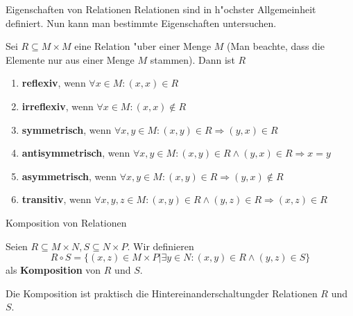 \documentclass{beamer}
\begin{document}
\begin{frame}{Eigenschaften von Relationen}
Relationen sind in h"ochster Allgemeinheit definiert. Nun kann man bestimmte Eigenschaften untersuchen.
\begin{definition}
Sei $R\subseteq M\times M$ eine Relation "uber einer Menge $M$ (Man beachte, dass die Elemente nur aus einer Menge $M$ stammen). Dann ist $R$
\begin{enumerate}
\item \textbf{reflexiv}, wenn $\forall x\in M: (x,x)\in R$
\item \textbf{irreflexiv}, wenn $\forall x\in M: (x,x)\notin R$
\item \textbf{symmetrisch}, wenn $\forall x,y\in M: (x,y)\in R\Rightarrow (y,x)\in R$
\item \textbf{antisymmetrisch}, wenn $\forall x,y\in M: (x,y)\in R\wedge (y,x)\in R\Rightarrow x=y$
\item \textbf{asymmetrisch}, wenn $\forall x,y\in M: (x,y)\in R\Rightarrow (y,x)\notin R$
\item \textbf{transitiv}, wenn $\forall x,y,z\in M: (x,y)\in R\wedge (y,z)\in R\Rightarrow (x,z)\in R$
\end{enumerate}
\end{definition}
\end{frame}

\begin{frame}{Komposition von Relationen}
\begin{definition}
  Seien $R\subseteq M\times N, S\subseteq N\times P$. Wir definieren 
  \[R\circ S=\{(x,z)\in M\times P|\exists y\in N:(x,y)\in R\wedge (y,z)\in S\}\]
  als \textbf{Komposition} von $R$ und $S$.

\end{definition}
Die Komposition ist praktisch die \glqq Hintereinanderschaltung\grqq der Relationen $R$ und $S$.
\end{frame}
\end{document}
